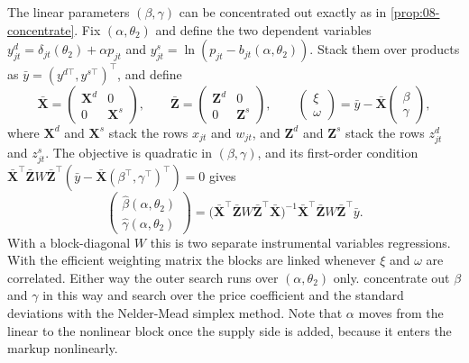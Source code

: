 The linear parameters $(\beta, \gamma)$ can be concentrated out exactly as in \cref{prop:08-concentrate}. Fix
$(\alpha, \theta_2)$ and define the two dependent variables $y^d_{jt} = \delta_{jt}(\theta_2) + \alpha p_{jt}$ and
$y^s_{jt} = \ln(p_{jt} - b_{jt}(\alpha, \theta_2))$. Stack them over products as
$\bar y = (y^{d\top}, y^{s\top})^\top$, and define
\begin{equation*}
  \bar{\bm{X}} = \begin{pmatrix} \bm{X}^d & 0 \\ 0 & \bm{X}^s \end{pmatrix}, \qquad
  \bar{\bm{Z}} = \begin{pmatrix} \bm{Z}^d & 0 \\ 0 & \bm{Z}^s \end{pmatrix}, \qquad
  \begin{pmatrix} \xi \\ \omega \end{pmatrix} = \bar y - \bar{\bm{X}} \begin{pmatrix} \beta \\ \gamma \end{pmatrix},
\end{equation*}
where $\bm{X}^d$ and $\bm{X}^s$ stack the rows $x_{jt}$ and $w_{jt}$, and $\bm{Z}^d$ and $\bm{Z}^s$ stack the rows
$z^d_{jt}$ and $z^s_{jt}$. The objective is quadratic in $(\beta, \gamma)$, and its first-order condition
$\bar{\bm{X}}^\top \bar{\bm{Z}} W \bar{\bm{Z}}^\top(\bar y - \bar{\bm{X}}(\beta^\top, \gamma^\top)^\top) = 0$ gives
\begin{equation}\label{eq:08-joint-conc}
  \begin{pmatrix} \hat\beta(\alpha, \theta_2) \\ \hat\gamma(\alpha, \theta_2) \end{pmatrix}
  = \big(\bar{\bm{X}}^\top \bar{\bm{Z}} W \bar{\bm{Z}}^\top \bar{\bm{X}}\big)^{-1}\bar{\bm{X}}^\top \bar{\bm{Z}} W
  \bar{\bm{Z}}^\top \bar y .
\end{equation}
With a block-diagonal $W$ this is two separate instrumental variables regressions. With the efficient weighting
matrix the blocks are linked whenever $\xi$ and $\omega$ are correlated. Either way the outer search runs over
$(\alpha, \theta_2)$ only. \citet[Section~6.5]{BerryLevinsohnPakes1995} concentrate out $\beta$ and $\gamma$ in this way
and search over the price coefficient and the standard deviations with the Nelder-Mead simplex method. Note that
$\alpha$ moves from the linear to the nonlinear block once the supply side is added, because it enters the markup
nonlinearly.

